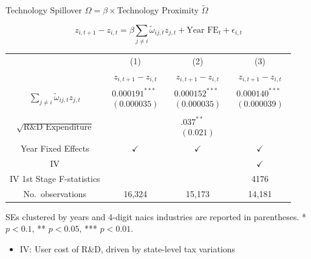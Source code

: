 \documentclass[
  aspectratio=169,  %
]{beamer}
\theoremstyle{plain}
\begin{document}
\begin{frame}{Technology Spillover $\Omega=\beta\times$Technology Proximity $\tilde{\Omega}$ \hyperlink{first_stage}{}}
  
  {\footnotesize
  \vspace{-5mm}
  \label{regression}

  \[
    z_{i,t+1}-z_{i,t}
      =\beta\sum_{j\neq i}\tilde{\omega}_{ij,t}z_{j,t}
      +\text{Year FE}_{t}
      +\epsilon_{i,t}
  \]
  \begin{center}
    \setlength{\tabcolsep}{3pt}
    \begin{tabular}{cccc}
      \hline\hline
       & (1) & (2) & (3) \\ 
       & $z_{i,t+1}-z_{i,t}$ 
       & $z_{i,t+1}-z_{i,t}$ 
       & $z_{i,t+1}-z_{i,t}$ \\
      \hline
      $\sum_{j\neq i}\tilde{\omega}_{ij,t}z_{j,t}$
        & $\begin{array}{c}\text{0.000191}^{***}\\(\text{0.000035})\end{array}$
        & $\begin{array}{c}\text{0.000152}^{***}\\(\text{0.000035})\end{array}$
        & $\begin{array}{c}\text{0.000140}^{***}\\(\text{0.000039})\end{array}$ \\

      $\sqrt{\text{R\&D Expenditure}}$
        & 
        & $\begin{array}{c}\text{.037}^{**}\\(\text{0.021})\end{array}$
        &  \\

      \hline
      Year Fixed Effects                & $\checkmark$ & $\checkmark$ & $\checkmark$ \\
      IV                                &            &            & $\checkmark$ \\
      IV 1st Stage F-statistics        &            &            & 4176        \\
      No.\ observations                & 16,324     & 15,173     & 14,181      \\
      \hline
    \end{tabular}
  \end{center}

  SEs clustered by years and 4-digit naics industries are reported in parentheses. 
  {*} $p<\text{0.1}$, {**} $p<\text{0.05}$, {***} $p<\text{0.01}$.}
\begin{itemize}
  \item IV: User cost of R\&D, driven by state-level tax variations \citep{Wilson2009-ri,Bloom2013-pn}
\end{itemize}
\end{frame}
\end{document}
